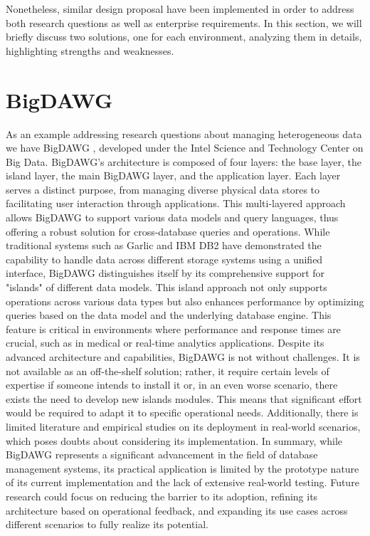 Nonetheless, similar design proposal have been implemented in order to address both research questions as well as enterprise requirements. In this section, we will briefly discuss two solutions, one for each environment, analyzing them in details, highlighting strengths and weaknesses.

\section{BigDAWG}
As an example addressing research questions about managing heterogeneous data we have BigDAWG \cite{DBLP:conf/hpec/GadepallyCDEHKM16}, developed under the Intel Science and Technology Center on Big Data. BigDAWG's architecture is composed of four layers: the base layer, the island layer, the main BigDAWG layer, and the application layer. Each layer serves a distinct purpose, from managing diverse physical data stores to facilitating user interaction through applications. This multi-layered approach allows BigDAWG to support various data models and query languages, thus offering a robust solution for cross-database queries and operations.
While traditional systems such as Garlic and IBM DB2 have demonstrated the capability to handle data across different storage systems using a unified interface, BigDAWG distinguishes itself by its comprehensive support for "islands" of different data models. This island approach not only supports operations across various data types but also enhances performance by optimizing queries based on the data model and the underlying database engine. This feature is critical in environments where performance and response times are crucial, such as in medical or real-time analytics applications.
Despite its advanced architecture and capabilities, BigDAWG is not without challenges. It is not available as an off-the-shelf solution; rather, it require certain levels of expertise if someone intends to install it or, in an even worse scenario, there exists the need to develop new islands modules. This means that significant effort would be required to adapt it to specific operational needs. Additionally, there is limited literature and empirical studies on its deployment in real-world scenarios, which poses doubts about considering its implementation.
In summary, while BigDAWG represents a significant advancement in the field of database management systems, its practical application is limited by the prototype nature of its current implementation and the lack of extensive real-world testing. Future research could focus on reducing the barrier to its adoption, refining its architecture based on operational feedback, and expanding its use cases across different scenarios to fully realize its potential.

